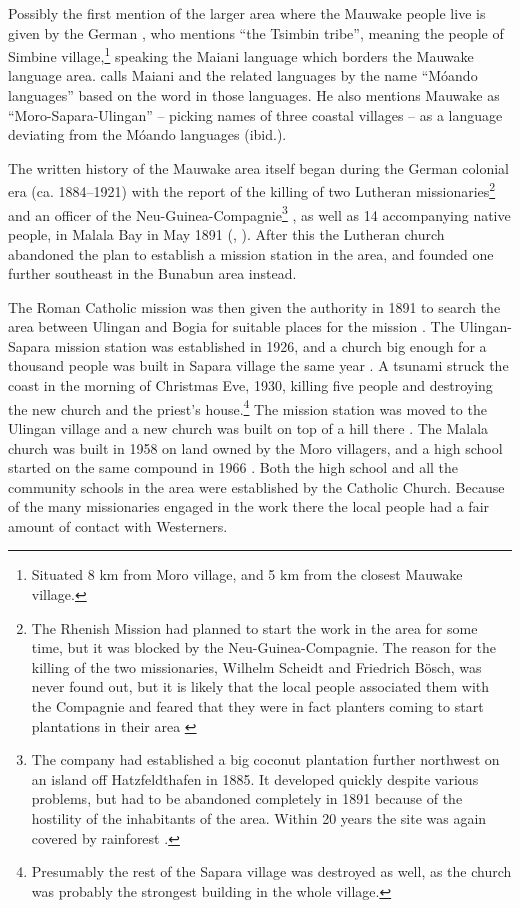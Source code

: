 Possibly the first mention of the larger area where the Mauwake people live is given by the German \citet[338]{Hollrung1888}, who mentions ``the Tsimbin tribe'', meaning the people of Simbine village,\footnote{Situated 8 km from Moro village, and 5 km from the closest Mauwake village.} speaking the Maiani language which borders the Mauwake language area. \citet[964]{Hoeltker1937} calls Maiani and the related languages by the name ``M\'oando languages'' based on the word  in those languages.  He also mentions Mauwake as ``Moro-Sapara-Ulingan'' -- picking names of three coastal villages -- as a language deviating from the M\'oando languages (ibid.). 

The written history of the Mauwake area itself began during the German colonial era (ca. 1884--1921) with the report of the killing of two Lutheran missionaries\footnote{The Rhenish Mission had planned to start the work in the area for some time, but it was blocked by the Neu-Guinea-Compagnie. The reason for the killing of the two missionaries, Wilhelm Scheidt and Friedrich Bösch, was never found out, but it is likely that the local people associated them with the Compagnie and feared that they were in fact planters coming to start plantations in their area \citep[106--107]{WagnerEtAl1986}} and an officer of the Neu-Guinea-Compagnie\footnote{The company had established a big coconut plantation further northwest on an island off Hatzfeldthafen in 1885. It developed quickly despite  various problems, but had to be abandoned completely in 1891 because of the hostility of the inhabitants of the area. Within 20 years the site was again covered by rainforest \citep[450--51]{Tranel1952}.} , as well as 14 accompanying native people, in Malala Bay in May 1891 (\citealt[454]{Tranel1952}, \citealt[106--109]{WagnerEtAl1986}).  After this the Lutheran church abandoned the plan to establish a mission station in the area, and founded one further southeast in the Bunabun area instead.

The Roman Catholic mission was then given the authority in 1891 to search the area between Ulingan and Bogia for suitable places for the mission \citep[8]{Duamba1996}.  The Ulingan-Sapara mission station was established in 1926, and a church big enough for a thousand people was built in Sapara village the same year \citep[21]{BrummEtAl1995}%
.  A tsunami struck the coast in the morning of Christmas Eve, 1930, killing five people and destroying the new church and the priest's house.\footnote{Presumably the rest of the Sapara village was destroyed as well, as the church was probably the strongest building in the whole village.}  The mission station was moved to the Ulingan village and a new church was built on top of a hill there \citep[20--21]{Davies1999}. The Malala church was built in 1958 on land owned by the Moro villagers, and a high school started on the same compound in 1966 \citep[45]{BrummEtAl1995}%
. Both the high school and all the community schools in the area were established by the Catholic Church.  Because of the many missionaries engaged in the work there the local people had a fair amount of contact with Westerners.

